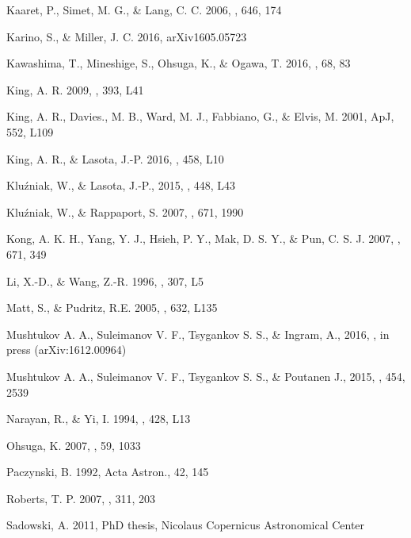 \documentclass[12pt,preprint]{aastex}
\begin{document}
\begin{thebibliography}{28}
Kaaret, P., Simet, M. G., \& Lang, C. C. 2006, \apj, 646, 174

Karino, S., \& Miller, J. C. 2016, arXiv1605.05723

Kawashima, T., Mineshige, S., Ohsuga, K., \& Ogawa, T. 2016, \pasj, 68, 83

King, A. R. 2009, \mnras, 393, L41

King, A. R., Davies., M. B., Ward, M. J., Fabbiano, G., \& Elvis, M. 2001, ApJ, 552, L109

King, A. R., \& Lasota, J.-P. 2016, \mnras, 458, L10

Klu\'zniak, W., \& Lasota, J.-P., 2015, \mnras, 448, L43

Klu\'zniak, W., \& Rappaport, S. 2007, \apj, 671, 1990

Kong, A. K. H., Yang, Y. J., Hsieh, P. Y., Mak, D. S. Y., \& Pun, C. S. J. 2007, \apj, 671, 349

Li, X.-D., \& Wang, Z.-R. 1996, \aap, 307, L5

Matt, S., \& Pudritz, R.E. 2005, \apj, 632, L135

Mushtukov A. A., Suleimanov V. F., Tsygankov S. S., \& Ingram, A., 2016, \mnras, in press (arXiv:1612.00964)

Mushtukov A. A., Suleimanov V. F., Tsygankov S. S., \& Poutanen J., 2015, \mnras, 454, 2539

Narayan, R., \& Yi, I. 1994, \apjl, 428, L13

Ohsuga, K. 2007, \pasj, 59, 1033

Paczynski, B. 1992, Acta Astron., 42, 145

Roberts, T. P. 2007, \apss, 311, 203

Sadowski, A. 2011, PhD thesis, Nicolaus Copernicus Astronomical Center


\end{thebibliography}
\end{document}
